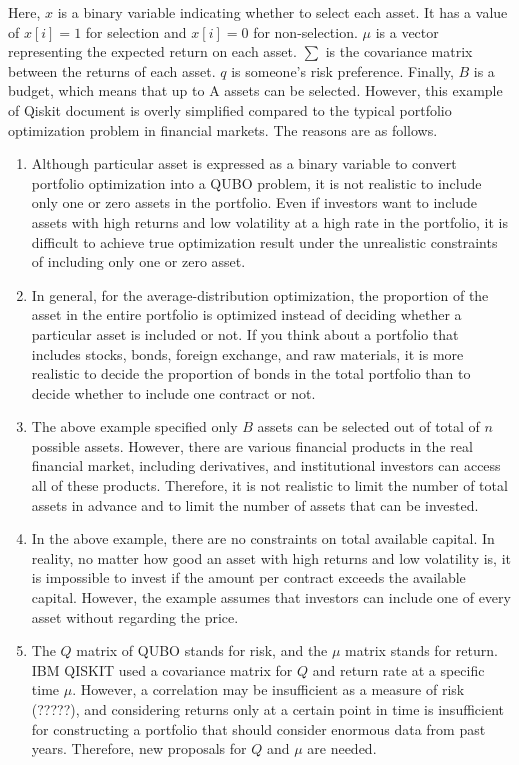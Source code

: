 \documentclass[a4paper]{article}
\theoremstyle{plain}
\theoremstyle{definition}
\begin{document}
Here, $x$ is a binary variable indicating whether to select each asset. It has a value of $x[i]=1$ for selection and $x[i]=0$ for non-selection. $\mu$  is a vector representing the expected return on each asset. $\displaystyle\sum$  is the covariance matrix between the returns of each asset. $q$ is someone's risk preference. Finally, $B$  is a budget, which means that up to A assets can be selected. However, this example of Qiskit document is overly simplified compared to the typical portfolio optimization problem in financial markets. The reasons are as follows.
\begin{enumerate}

\item Although particular asset is expressed as a binary variable to convert portfolio optimization into a QUBO problem, it is not realistic to include only one or zero assets in the portfolio. Even if investors want to include assets with high returns and low volatility  at a high rate in the portfolio, it is difficult to achieve true optimization result under the unrealistic constraints of including only one or zero asset. 

\item In general, for the average-distribution optimization, the proportion of the asset in the entire portfolio is optimized instead of deciding whether a particular asset is included or not. If you think about a portfolio that includes stocks, bonds, foreign exchange, and raw materials, it is more realistic to decide the proportion of bonds in the total portfolio than to decide whether to include one contract or not.

\item The above example specified only $B$ assets can be selected out of total of $n$  possible assets. However, there are various financial products in the real financial market, including derivatives, and institutional investors can access all of these products. Therefore, it is not realistic to limit the number of total assets in advance and to limit the number of assets that can be invested. 

\item In the above example, there are no constraints on total available capital. In reality, no matter how good an asset with high returns and low volatility is, it is impossible to invest if the amount per contract exceeds the available capital. However, the example assumes that investors can include one of every asset without regarding the price. 

\item  The $Q$ matrix of QUBO stands for risk, and the $\mu$ matrix stands for return. IBM QISKIT used a covariance matrix for $Q$ and return rate at a specific time $\mu$. However, a correlation may be insufficient as a measure of risk (?????), and considering returns only at a certain point in time is insufficient for constructing a portfolio that should consider enormous data from past years. Therefore, new proposals for $Q$ and $\mu$ are needed.

\end{enumerate}

\end{document}
